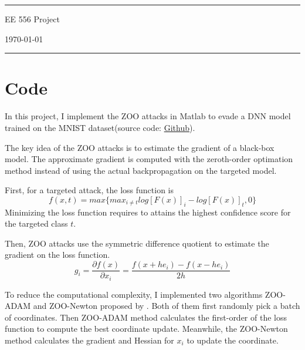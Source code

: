 \documentclass[a4paper]{article}
\begin{document}

\fancyhead[C]{}
\hrule \medskip %
\begin{minipage}{0.295\textwidth} 
\raggedright
\footnotesize

\end{minipage}
\begin{minipage}{0.4\textwidth} 
\centering 
\large 
EE 556 Project\\ 
\normalsize 
\end{minipage}
\begin{minipage}{0.295\textwidth} 
\raggedleft
\today\hfill\\
\end{minipage}
\medskip\hrule 
\bigskip


\section{Code}
In this project, I implement the ZOO attacks in Matlab to evade a DNN model trained on the MNIST dataset(source code: \href{https://github.com/Moirai7/ee556/}{Github}).

The key idea of the ZOO attacks is to estimate the gradient of a black-box model. The approximate gradient is computed with the zeroth-order optimation method instead of using the actual backpropagation on the targeted model. 

First, for a targeted attack, the loss function is 
\begin{equation}
f(x,t) = max\{max_{i\neq t}log[F(x)]_i - log[F(x)]_t, 0\}
\end{equation} 
Minimizing the loss function requires to attains the highest confidence score for the targeted class $t$.

Then, ZOO attacks use the symmetric difference quotient to estimate the gradient on the loss function.
\begin{equation}
g_i = \frac{\partial f(x)}{\partial x_i} = \frac{f(x+he_i)-f(x-he_i)}{2h}
\end{equation}

To reduce the computational complexity, I implemented two algorithms ZOO-ADAM and ZOO-Newton proposed by \cite{1}. Both of them first randomly pick a batch of coordinates. Then ZOO-ADAM method calculates the first-order of the loss function to compute the best coordinate update. Meanwhile, the ZOO-Newton method calculates the gradient and Hessian for $x_i$ to update the coordinate.
\end{document}

